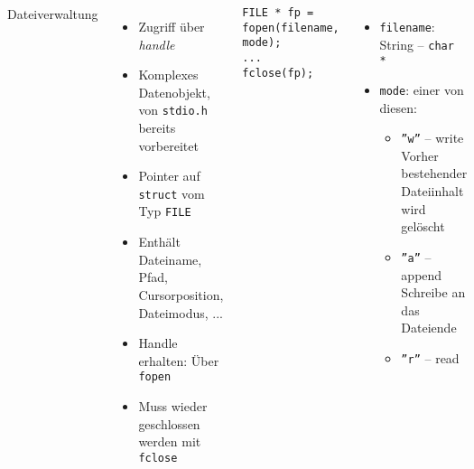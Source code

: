 \begin{frame}[fragile]
%
\begin{columns}[T]
\begin{Large}
Dateiverwaltung
\vspace{10pt}
\end{Large}
%
\begin{itemize}
\item Zugriff über \emph{handle}
	\item Komplexes Datenobjekt, von \texttt{stdio.h} bereits vorbereitet
	\item Pointer auf \texttt{struct} vom Typ \texttt{FILE}
	\item Enthält Dateiname, Pfad, Cursorposition, Dateimodus, ...
\item Handle erhalten: Über \texttt{fopen}
\item Muss wieder geschlossen werden mit \texttt{fclose}
\end{itemize}
%
\begin{codebox}
\begin{verbatim}
FILE * fp = fopen(filename, mode);
...
fclose(fp);
\end{verbatim}
\end{codebox}
%
\begin{itemize}
\item \texttt{filename}: String -- \texttt{char *}
\item \texttt{mode}: einer von diesen:
	\begin{itemize}
	\item \texttt{''w''} -- write\newline
		Vorher bestehender Dateiinhalt wird gelöscht
	\item \texttt{''a''} -- append\newline
		Schreibe an das Dateiende
	\item \texttt{''r''} -- read
	\end{itemize}
\end{itemize}
%
\end{columns}
%
\end{frame}


